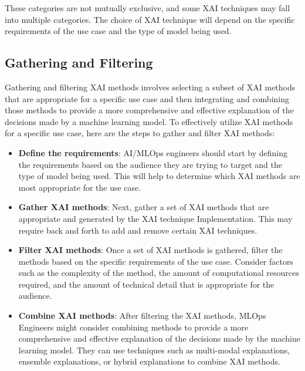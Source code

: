 \documentclass[conference]{IEEEtran}
\begin{document}
These categories are not mutually exclusive, and some XAI techniques may fall into multiple categories. The choice of XAI technique will depend on the specific requirements of the use case and the type of model being used.

\subsection{Gathering and Filtering} Gathering and filtering XAI methods involves selecting a subset of XAI methods that are appropriate for a specific use case and then integrating and combining those methods to provide a more comprehensive and effective explanation of the decisions made by a machine learning model. To effectively utilize XAI methods for a specific use case, here are the steps to gather and filter XAI methods: 
\begin{itemize}
	\item \textbf{Define the requirements}: AI/MLOps engineers should start by defining the requirements based on the audience they are trying to target and the type of model being used. This will help to determine which XAI methods are most appropriate for the use case.
	\item \textbf{Gather XAI methods}: Next, gather a set of XAI methods that are appropriate and generated by the XAI technique Implementation. This may require back and forth to add and remove certain XAI techniques.
	\item \textbf{Filter XAI methods}: Once a set of XAI methods is gathered, filter the methods based on the specific requirements of the use case. Consider factors such as the complexity of the method, the amount of computational resources required, and the amount of technical detail that is appropriate for the audience.
	\item \textbf{Combine XAI methods}: After filtering the XAI methods, MLOps Engineers might consider combining methods to provide a more comprehensive and effective explanation of the decisions made by the machine learning model. They can use techniques such as multi-modal explanations, ensemble explanations, or hybrid explanations to combine XAI methods.
\end{itemize}
\end{document}

